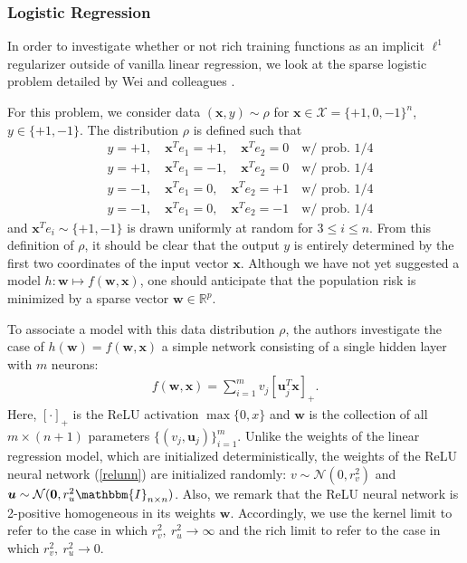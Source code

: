 \documentclass{article}
\begin{document}
\subsubsection{Logistic Regression}

In order to investigate whether or not rich training functions as an implicit $\ell^1$ regularizer outside of vanilla linear regression, we look at the sparse logistic problem detailed by Wei and colleagues \cite{wei2019regularization}. 

For this problem, we consider data $(\boldsymbol{x}, y) \sim \rho$ for $\boldsymbol{x} \in \mathcal{X} = \{ +1, 0, -1 \}^n$, $y \in \{+1, -1\}$. The distribution $\rho$ is defined such that 
\begin{align*}
    &y = +1, \quad \boldsymbol{x}^Te_1 = +1, \quad \boldsymbol{x}^Te_2 = 0 \quad \text{w/ prob. 1/4}\\
    &y = +1, \quad \boldsymbol{x}^Te_1 = -1, \quad \boldsymbol{x}^Te_2 = 0 \quad \text{w/ prob. 1/4}\\
    &y = -1, \quad \boldsymbol{x}^Te_1 = 0, \quad \boldsymbol{x}^Te_2 = +1 \quad \text{w/ prob. 1/4}\\
    &y = -1, \quad \boldsymbol{x}^Te_1 = 0, \quad \boldsymbol{x}^Te_2 = -1 \quad \text{w/ prob. 1/4}
\end{align*}
and $\boldsymbol{x}^Te_i \sim \{+1, -1 \}$ is drawn uniformly at random for $3 \leq i \leq n$. From this definition of $\rho$, it should be clear that the output $y$ is entirely determined by the first two coordinates of the input vector $\boldsymbol{x}$. Although we have not yet suggested a model $h: \boldsymbol{w} \mapsto f(\boldsymbol{w}, \boldsymbol{x})$, one should anticipate that the population risk is minimized by a sparse vector $\boldsymbol{w} \in \mathbb{R}^p$.

To associate a model with this data distribution $\rho$, the authors investigate the case of $h(\boldsymbol{w}) = f(\boldsymbol{w}, \boldsymbol{x})$ a simple network consisting of a single hidden layer with $m$ neurons:
\begin{align}\label{relunn}
    f(\boldsymbol{w}, \boldsymbol{x}) = \sum_{i=1}^m v_j[\boldsymbol{u}_j^T\boldsymbol{x}]_+.
\end{align}
Here, $[\cdot]_+$ is the ReLU activation $\max\{0, x \}$ and $\boldsymbol{w}$ is the collection of all $m \times (n+1)$ parameters $\{ (v_j, \boldsymbol{u}_j) \}_{i=1}^m$. Unlike the weights of the linear regression model, which are initialized deterministically, the weights of the ReLU neural network (\ref{relunn}) are initialized randomly: $v \sim \mathcal{N}(0, r_v^2)$ and $\boldsymbol{u} \sim \mathcal{N}(\boldsymbol{0}, r_u^2\mathbbm{I}_{n \times n})$. Also, we remark that the ReLU neural network is 2-positive homogeneous in its weights $\boldsymbol{w}$. Accordingly, we use the kernel limit to refer to the case in which $r_v^2, \ r_u^2 \rightarrow \infty$ and the rich limit to refer to the case in which $r_v^2, \ r_u^2 \rightarrow 0$. 
\end{document}
